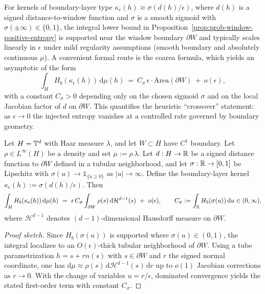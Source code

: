 \begin{remark}\label{rem:entropy-scaling-eps}
For kernels of boundary-layer type $\kappa_\epsilon(h)\approx \sigma(d(h)/\epsilon)$, where $d(h)$ is a signed distance-to-window function and $\sigma$ is a smooth sigmoid with $\sigma(\pm\infty)\in\{0,1\}$, the integral lower bound in Proposition~\ref{prop:prob-window-positive-entropy} is supported near the window boundary $\partial W$ and typically scales linearly in $\epsilon$ under mild regularity assumptions (smooth boundary and absolutely continuous $\mu$). A convenient formal route is the coarea formula, which yields an asymptotic of the form
\[
\int_H H_b(\kappa_\epsilon(h))\,\mathrm{d}\mu(h)\ =\ C_\sigma\,\epsilon\cdot \mathrm{Area}(\partial W)\ +\ o(\epsilon),
\]
with a constant $C_\sigma>0$ depending only on the chosen sigmoid $\sigma$ and on the local Jacobian factor of $d$ on $\partial W$. This quantifies the heuristic ``crossover'' statement: as $\epsilon\to 0$ the injected entropy vanishes at a controlled rate governed by boundary geometry.
\end{remark}

\begin{proposition}\label{prop:boundary-layer-scaling}
Let $H=\mathbb{T}^d$ with Haar measure $\lambda$, and let $W\subset H$ have $C^1$ boundary.
Let $\rho\in L^\infty(H)$ be a density and set $\mu:=\rho\,\lambda$.
Let $d:H\to\mathbb{R}$ be a signed distance function to $\partial W$ defined in a tubular neighborhood, and let $\sigma:\mathbb{R}\to[0,1]$ be Lipschitz with $\sigma(u)\to \mathds{1}_{\{u\ge 0\}}$ as $|u|\to\infty$.
Define the boundary-layer kernel $\kappa_\epsilon(h):=\sigma(d(h)/\epsilon)$.
Then
\[
\int_H H_b(\kappa_\epsilon(h))\,\mathrm{d}\mu(h)
\ =\
\epsilon\,C_\sigma\int_{\partial W}\rho(s)\,\mathrm{d}\mathcal{H}^{d-1}(s)
\ +\ o(\epsilon),
\qquad
C_\sigma:=\int_{\mathbb{R}} H_b(\sigma(u))\,\mathrm{d}u \in (0,\infty),
\]
where $\mathcal{H}^{d-1}$ denotes $(d-1)$-dimensional Hausdorff measure on $\partial W$.
\end{proposition}

\begin{proof}[Proof sketch]
Since $H_b(\sigma(u))$ is supported where $\sigma(u)\in(0,1)$, the integral localizes to an $O(\epsilon)$-thick tubular neighborhood of $\partial W$.
Using a tube parametrization $h=s+r n(s)$ with $s\in\partial W$ and $r$ the signed normal coordinate, one has $\mathrm{d}\mu \approx \rho(s)\,\mathrm{d}\mathcal{H}^{d-1}(s)\,\mathrm{d}r$ up to $o(1)$ Jacobian corrections as $r\to 0$.
With the change of variables $u=r/\epsilon$, dominated convergence yields the stated first-order term with constant $C_\sigma$.
\end{proof}

